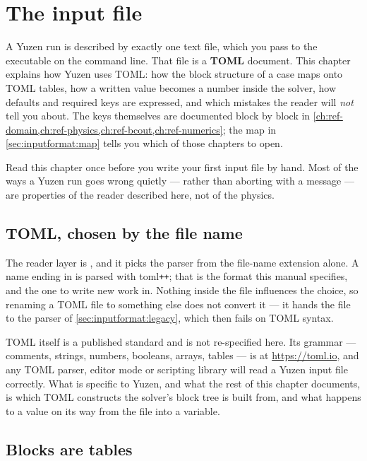 \chapter{The input file}
\label{ch:inputformat}

A Yuzen run is described by exactly one text file, which you pass to the
executable on the command line. That file is a \textbf{TOML} document. This
chapter explains how Yuzen uses TOML: how the block structure of a case maps
onto TOML tables, how a written value becomes a number inside the solver, how
defaults and required keys are expressed, and which mistakes the reader will
\emph{not} tell you about. The keys themselves are documented block by block in
\cref{ch:ref-domain,ch:ref-physics,ch:ref-bcout,ch:ref-numerics}; the map in
\cref{sec:inputformat:map} tells you which of those chapters to open.

Read this chapter once before you write your first input file by hand. Most of
the ways a Yuzen run goes wrong quietly --- rather than aborting with a message
--- are properties of the reader described here, not of the physics.

\section{TOML, chosen by the file name}
\label{sec:inputformat:formats}

The reader layer is , and it picks the parser from
the file-name extension alone. A name ending in  is parsed with
toml\texttt{++}; that is the format this manual specifies, and the one to write
new work in. Nothing inside the file influences the choice, so renaming a TOML
file to something else does not convert it --- it hands the file to the 
parser of \cref{sec:inputformat:legacy}, which then fails on TOML syntax.

TOML itself is a published standard and is not re-specified here. Its grammar
--- comments, strings, numbers, booleans, arrays, tables --- is at
\url{https://toml.io}, and any TOML parser, editor mode or scripting library
will read a Yuzen input file correctly. What is specific to Yuzen, and what the
rest of this chapter documents, is which TOML constructs the solver's block
tree is built from, and what happens to a value on its way from the file into a
variable.

\section{Blocks are tables}
\label{sec:inputformat:tables}

